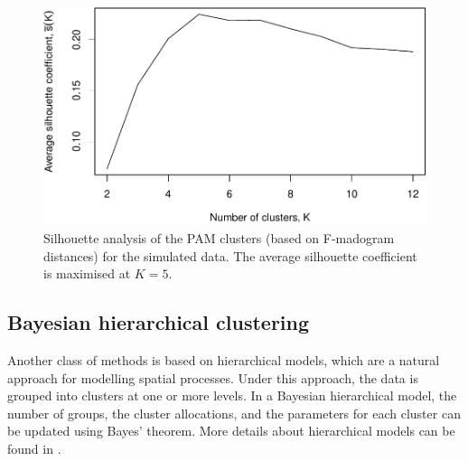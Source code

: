 \documentclass[en-GB, a4paper, nobind]{templates/bathreport}
\begin{document}
\begin{figure}

{\centering \includegraphics[width=0.7\linewidth]{figures/simHR-pam-silwidths-1} 

}

\caption[Silhouette analysis of PAM clusters for the simulated data.]{Silhouette analysis of the PAM clusters (based on F-madogram distances) for the simulated data. The average silhouette coefficient is maximised at $K=5$.}\label{fig:simHR-pam-silwidths}
\end{figure}

\hypertarget{bayesian-hierarchical-clustering}{%
\subsection{Bayesian hierarchical clustering}\label{bayesian-hierarchical-clustering}}

Another class of methods is based on hierarchical models, which are a natural approach for modelling spatial processes. Under this approach, the data is grouped into clusters at one or more levels. In a Bayesian hierarchical model, the number of groups, the cluster allocations, and the parameters for each cluster can be updated using Bayes' theorem. More details about hierarchical models can be found in \textcite{schervishTheoryStatistics1995}.
\end{document}
